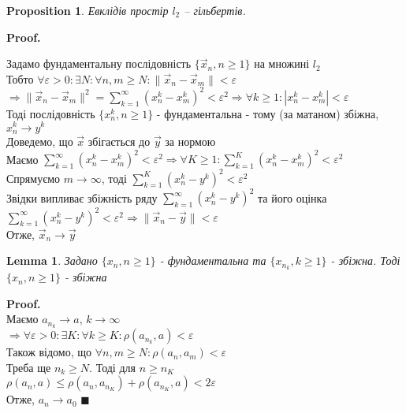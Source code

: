 \documentclass[a4paper, 10pt]{article}
\makeatletter
\theoremstyle{theoremdd}
\theoremstyle{theoremdd}
\theoremstyle{theoremdd}
\theoremstyle{theoremdd}
\theoremstyle{theoremdd}
\newtheorem{proposition}[theorem]{Proposition}
\theoremstyle{theoremdd}
\theoremstyle{theoremdd}
\newtheorem{lemma}[theorem]{Lemma}
\theoremstyle{theoremdd}
\renewenvironment{proof}[1][Proof.\\]{\par
\pushQED{\hfill \qed}%
\normalfont \topsep6\p@\@plus6\p@\relax
\trivlist
\item\relax
{\bfseries
#1\@addpunct{.}}\hspace\labelsep\ignorespaces
}{%
\popQED\endtrivlist\@endpefalse
}
\newenvironment{pf}{\vspace*{-3mm} \textbf{Proof. \\}}{$\blacksquare$}
\makeatother
\begin{document}
\begin{proposition}
Евклідів простір $l_2$ -- гільбертів.
\end{proposition}

\begin{proof}
Задамо фундаментальну послідовність $\{\vec{x}_n, n \geq 1\}$ на множині $l_2$\\
Тобто $\forall \varepsilon > 0: \exists N: \forall n, m \geq N: \|\vec{x}_n - \vec{x}_m\| < \varepsilon$\\
$\Rightarrow \|\vec{x}_n - \vec{x}_m\|^2 = \displaystyle\sum_{k=1}^\infty (x_n^k - x_m^k)^2 < \varepsilon^2 \Rightarrow \forall k \geq 1: |x_n^k - x_m^k| < \varepsilon$\\
Тоді послідовність $\{x_n^k, n \geq 1\}$ - фундаментальна - тому (за матаном) збіжна, $x_n^k \to y^k$\\
Доведемо, що $\vec{x}$ збігається до $\vec{y}$ за нормою\\
Маємо $\displaystyle\sum_{k=1}^\infty (x_n^k - x_m^k)^2 < \varepsilon^2 \Rightarrow \forall K \geq 1: \displaystyle\sum_{k=1}^K (x_n^k - x_m^k)^2 < \varepsilon^2$\\
Спрямуємо $m \to \infty$, тоді $\displaystyle\sum_{k=1}^K (x_n^k - y^k)^2 < \varepsilon^2$\\
Звідки випливає збіжність ряду $\displaystyle\sum_{k=1}^\infty (x_n^k - y^k)^2$ та його оцінка\\
$\displaystyle\sum_{k=1}^\infty (x_n^k - y^k)^2 < \varepsilon^2 \Rightarrow \|\vec{x}_n - \vec{y}\| < \varepsilon$\\
Отже, $\vec{x}_n \to \vec{y}$
\end{proof}

\begin{lemma}
Задано $\{x_n, n \geq 1\}$ - фундаментальна та $\{x_{n_k}, k \geq 1\}$ - збіжна. Тоді $\{x_n, n \geq 1\}$ - збіжна
\end{lemma}
\begin{pf}
Маємо $a_{n_k} \to a$, $k \to \infty$\\
$\Rightarrow \forall \varepsilon > 0: \exists K: \forall k \geq K: \rho(a_{n_k}, a) < \varepsilon$\\
Також відомо, що  $\forall n,m \geq N: \rho(a_n,a_m) < \varepsilon$\\
Треба ще $n_k \geq N$. Тоді для $n \geq n_K$\\
$\rho(a_n,a) \leq \rho(a_n,a_{n_K}) + \rho(a_{n_K},a) < 2\varepsilon$\\
Отже, $a_n \to a_0$
\end{pf}
\end{document}
